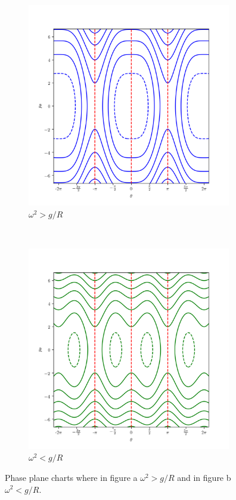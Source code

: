 \documentclass[12pt]{article}
\begin{document}
\begin{figure}[h]
    \centering
    \begin{subfigure}[t]{0.5\textwidth}
        \centering
        \includegraphics[height=3.5in]{phase_plane_1.png}
        \caption{$\omega^{2} > g/R$}
    \end{subfigure}%
    ~ 
    \begin{subfigure}[t]{0.5\textwidth}
        \centering
        \includegraphics[height=3.5in]{phase_plane_2.png}
        \caption{$\omega^{2} < g/R$}
    \end{subfigure}
    \caption{Phase plane charts where in figure a $\omega^{2} > g/R$ and in figure b $\omega^{2} < g/R$.}
\end{figure}
\end{document}
